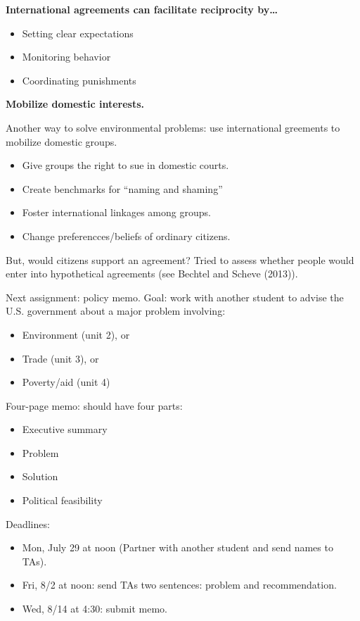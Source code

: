\documentclass{article}
\begin{document}
  {\bf International agreements can facilitate reciprocity by\ldots}

  \begin{itemize}
    \item Setting clear expectations
    \item Monitoring behavior
    \item Coordinating punishments
  \end{itemize}

  {\bf Mobilize domestic interests.}

  Another way to solve environmental problems: use international greements to mobilize domestic groups.

  \begin{itemize}
    \item Give groups the right to sue in domestic courts.
    \item Create benchmarks for ``naming and shaming''
    \item Foster international linkages among groups.
    \item Change preferencces/beliefs of ordinary citizens.
  \end{itemize}

  But, would citizens support an agreement? Tried to assess whether people would enter into hypothetical agreements (see Bechtel and Scheve (2013)).

  Next assignment: policy memo.  Goal: work with another student to advise the U.S. government about a major problem involving:
  
  \begin{itemize}
    \item Environment (unit 2), or
    \item Trade (unit 3), or
    \item Poverty/aid (unit 4)
  \end{itemize}

  Four-page memo: should have four parts:
  \begin{itemize}
    \item Executive summary
    \item Problem
    \item Solution
    \item Political feasibility
  \end{itemize}

  Deadlines:
  \begin{itemize}
    \item Mon, July 29 at noon (Partner with another student and send names to TAs).
    \item Fri, 8/2 at noon: send TAs two sentences: problem and recommendation.
    \item Wed, 8/14 at 4:30: submit memo.
  \end{itemize}
\end{document}
